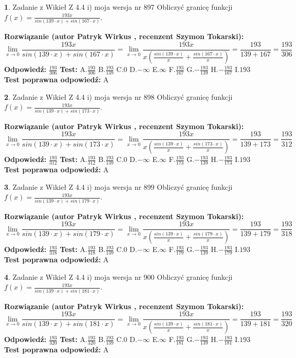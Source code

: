 \documentclass[12pt, a4paper]{article}
\theoremstyle{definition} %
\newtheorem{zad}{}
\newcommand{\zadStart}[1]{\begin{zad}#1\newline}
\newcommand{\zadStop}{\end{zad}}
\newcommand{\rozwStart}[2]{\noindent \textbf{Rozwiązanie (autor #1 , recenzent #2): }\newline}
\newcommand{\rozwStop}{\newline}
\newcommand{\odpStart}{\noindent \textbf{Odpowiedź:}\newline}
\newcommand{\odpStop}{\newline}
\newcommand{\testStart}{\noindent \textbf{Test:}\newline}
\newcommand{\testStop}{\newline}
\newcommand{\kluczStart}{\noindent \textbf{Test poprawna odpowiedź:}\newline}
\newcommand{\kluczStop}{\newline}
\begin{document}
\zadStart{Zadanie z Wikieł Z 4.4 i) moja wersja nr 897}
Obliczyć granicę funkcji $f(x)=\frac{193x}{sin(139\cdot x) +sin(167\cdot x)}$.
\zadStop
\rozwStart{Patryk Wirkus}{Szymon Tokarski}
$$\lim\limits_{x\to 0}\frac{193x}{sin(139\cdot x) +sin(167\cdot x)}=\lim\limits_{x\to 0}\frac{193x}{x(\frac{sin(139\cdot x)}{x}+\frac{sin(167\cdot x)}{x})}=\frac{193}{139+167} = \frac{193}{306}$$
\rozwStop
\odpStart
$\frac{193}{306}$
\odpStop
\testStart
A.$\frac{193}{306}$
B.$\frac{193}{139}$
C.$0$
D.$-\infty$
E.$\infty$
F.$\frac{193}{167}$
G.$-\frac{193}{139}$
H.$-\frac{193}{167}$
I.$193$
\testStop
\kluczStart
A
\kluczStop



\zadStart{Zadanie z Wikieł Z 4.4 i) moja wersja nr 898}
Obliczyć granicę funkcji $f(x)=\frac{193x}{sin(139\cdot x) +sin(173\cdot x)}$.
\zadStop
\rozwStart{Patryk Wirkus}{Szymon Tokarski}
$$\lim\limits_{x\to 0}\frac{193x}{sin(139\cdot x) +sin(173\cdot x)}=\lim\limits_{x\to 0}\frac{193x}{x(\frac{sin(139\cdot x)}{x}+\frac{sin(173\cdot x)}{x})}=\frac{193}{139+173} = \frac{193}{312}$$
\rozwStop
\odpStart
$\frac{193}{312}$
\odpStop
\testStart
A.$\frac{193}{312}$
B.$\frac{193}{139}$
C.$0$
D.$-\infty$
E.$\infty$
F.$\frac{193}{173}$
G.$-\frac{193}{139}$
H.$-\frac{193}{173}$
I.$193$
\testStop
\kluczStart
A
\kluczStop



\zadStart{Zadanie z Wikieł Z 4.4 i) moja wersja nr 899}
Obliczyć granicę funkcji $f(x)=\frac{193x}{sin(139\cdot x) +sin(179\cdot x)}$.
\zadStop
\rozwStart{Patryk Wirkus}{Szymon Tokarski}
$$\lim\limits_{x\to 0}\frac{193x}{sin(139\cdot x) +sin(179\cdot x)}=\lim\limits_{x\to 0}\frac{193x}{x(\frac{sin(139\cdot x)}{x}+\frac{sin(179\cdot x)}{x})}=\frac{193}{139+179} = \frac{193}{318}$$
\rozwStop
\odpStart
$\frac{193}{318}$
\odpStop
\testStart
A.$\frac{193}{318}$
B.$\frac{193}{139}$
C.$0$
D.$-\infty$
E.$\infty$
F.$\frac{193}{179}$
G.$-\frac{193}{139}$
H.$-\frac{193}{179}$
I.$193$
\testStop
\kluczStart
A
\kluczStop



\zadStart{Zadanie z Wikieł Z 4.4 i) moja wersja nr 900}
Obliczyć granicę funkcji $f(x)=\frac{193x}{sin(139\cdot x) +sin(181\cdot x)}$.
\zadStop
\rozwStart{Patryk Wirkus}{Szymon Tokarski}
$$\lim\limits_{x\to 0}\frac{193x}{sin(139\cdot x) +sin(181\cdot x)}=\lim\limits_{x\to 0}\frac{193x}{x(\frac{sin(139\cdot x)}{x}+\frac{sin(181\cdot x)}{x})}=\frac{193}{139+181} = \frac{193}{320}$$
\rozwStop
\odpStart
$\frac{193}{320}$
\odpStop
\testStart
A.$\frac{193}{320}$
B.$\frac{193}{139}$
C.$0$
D.$-\infty$
E.$\infty$
F.$\frac{193}{181}$
G.$-\frac{193}{139}$
H.$-\frac{193}{181}$
I.$193$
\testStop
\kluczStart
A
\kluczStop
\end{document}
